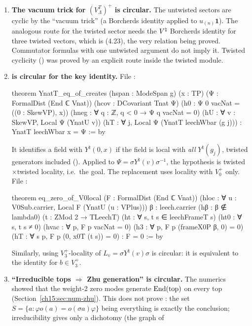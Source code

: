 \begin{enumerate}
\item \textbf{The vacuum trick for $(V_\Lambda^T)^+$ is circular.} The untwisted sectors are cyclic
  by the ``vacuum trick'' (a Borcherds identity applied to $u_{(n)}\mathbf 1$). The analogous route
  for the twisted sector needs the ${V^{\natural}}$ Borcherds identity for three twisted vectors, which is
  (4.23), the very relation being proved. Commutator formulas with one untwisted argument do not
  imply it. Twisted cyclicity () was proved by an explicit route inside the
  twisted module.
\item \textbf{ is circular for the key identity.} File
  :
\begin{leancode}
theorem YnatT_eq_of_creates (hspan : ModeSpan g) (x : TP) (Ψ : FormalDist (End ℂ Vnat))
    (hcov : DCovariant Tnat Ψ) (h0 : Ψ 0 vacNat = ((0 : SkewVP), x))
    (hneg : ∀ q : ℤ, q < 0 → Ψ q vacNat = 0) (hU : ∀ v : SkewVP, Local Ψ (YnatU v))
    (hT : ∀ j, Local Ψ (YnatT leechWbar (g j))) : YnatT leechWbar x = Ψ := by
\end{leancode}
  It identifies a field with $Y^\natural(0,x)$ if the field is local with \emph{all} $Y^\natural(g_j)$,
  twisted generators included (). Applied to $\Psi=\sigma Y^\natural(v)\sigma^{-1}$, the
  hypothesis  is twisted$\times$twisted locality, i.e.\ the goal. The replacement uses
  locality with $V_0^+$ only. File :
\begin{leancode}
theorem eq_zero_of_V0local (F : FormalDist (End ℂ Vnat))
    (hloc : ∀ u : V0Sub.carrier, Local F (YnatU (u : VPlus)))
    {β : leech.carrier} (hβ : β ∉ lambda0) (t : ZMod 2 → TLeechT)
    (ht : ∀ s, t s ∈ leechFrameT s) (ht0 : ∀ s, t s ≠ 0)
    (hvac : ∀ p, F p vacNat = 0) (h3 : ∀ p, F p (frameX0P β, 0) = 0)
    (hT : ∀ s p, F p (0, x0T (t s)) = 0) : F = 0 := by
\end{leancode}
  Similarly, using $V_3^+$-locality of $L_v=\sigma Y^\natural(v)\sigma$ is circular: it is equivalent to
  the identity for $b\in V_3^+$.
\item \textbf{``Irreducible tops $\Rightarrow$ Zhu generation'' is circular.} The numerics showed that
  the weight-2 zero modes generate $\operatorname{End}(\mathrm{top})$ on every top (Section~\ref{ch15:sec:num-zhu}).
  This does not prove : the set $S=\{a:\varphi o(a)=o(\sigma a)\varphi\}$ being
  everything is exactly the conclusion; irreducibility gives only a dichotomy (the graph of

\end{enumerate}
